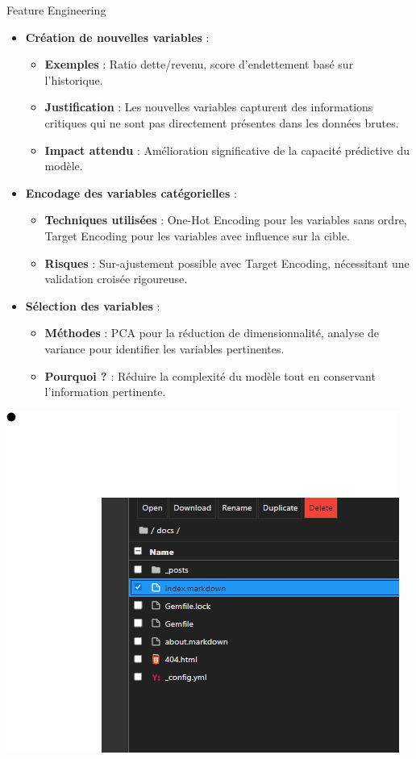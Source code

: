 \documentclass{beamer}
\begin{document}
\begin{frame}{Feature Engineering}
    \begin{itemize}
        \item \textbf{Création de nouvelles variables} :
            \begin{itemize}
                \item \textbf{Exemples} : Ratio dette/revenu, score d'endettement basé sur l'historique.
                \item \textbf{Justification} : Les nouvelles variables capturent des informations critiques qui ne sont pas directement présentes dans les données brutes.
                \item \textbf{Impact attendu} : Amélioration significative de la capacité prédictive du modèle.
            \end{itemize}
        \item \textbf{Encodage des variables catégorielles} :
            \begin{itemize}
                \item \textbf{Techniques utilisées} : One-Hot Encoding pour les variables sans ordre, Target Encoding pour les variables avec influence sur la cible.
                \item \textbf{Risques} : Sur-ajustement possible avec Target Encoding, nécessitant une validation croisée rigoureuse.
            \end{itemize}
        \item \textbf{Sélection des variables} :
            \begin{itemize}
                \item \textbf{Méthodes} : PCA pour la réduction de dimensionnalité, analyse de variance pour identifier les variables pertinentes.
                \item \textbf{Pourquoi ?} : Réduire la complexité du modèle tout en conservant l'information pertinente.
            \end{itemize}
    \end{itemize}
    \includegraphics[width=\textwidth]{assets/test.png} %
\end{frame}
\end{document}
